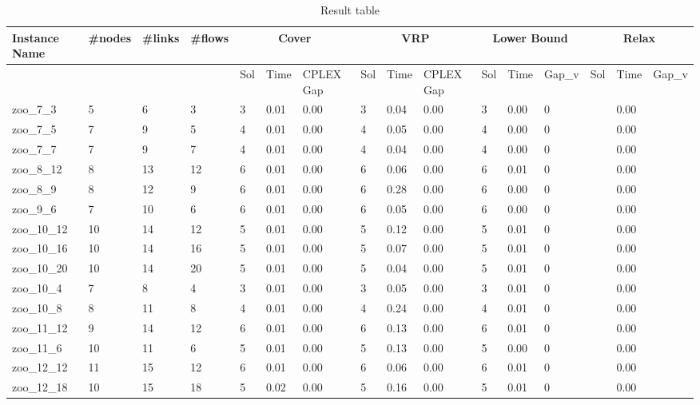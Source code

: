 \begin{landscape}
\begin{longtable}{llllllllllllllll}
\caption{Result table}
\hline
Instance Name & \#nodes & \#links & \#flows & \multicolumn{3}{c|}{Cover} & \multicolumn{3}{c|}{VRP} & \multicolumn{3}{c|}{Lower Bound} & \multicolumn{3}{c|}{Relax} \\ \hline
& & & & Sol & Time & CPLEX Gap & Sol & Time & CPLEX Gap & Sol & Time & Gap_v & Sol & Time & Gap_v \\ \hline
zoo\_7\_3 & 5 & 6 & 3 & 3 & 0.01 & 0.00 & 3 & 0.04 & 0.00 & 3 & 0.00 & 0 &  & 0.00 &  \\ \hline 
zoo\_7\_5 & 7 & 9 & 5 & 4 & 0.01 & 0.00 & 4 & 0.05 & 0.00 & 4 & 0.00 & 0 &  & 0.00 &  \\ \hline 
zoo\_7\_7 & 7 & 9 & 7 & 4 & 0.01 & 0.00 & 4 & 0.04 & 0.00 & 4 & 0.00 & 0 &  & 0.00 &  \\ \hline 
zoo\_8\_12 & 8 & 13 & 12 & 6 & 0.01 & 0.00 & 6 & 0.06 & 0.00 & 6 & 0.01 & 0 &  & 0.00 &  \\ \hline 
zoo\_8\_9 & 8 & 12 & 9 & 6 & 0.01 & 0.00 & 6 & 0.28 & 0.00 & 6 & 0.00 & 0 &  & 0.00 &  \\ \hline 
zoo\_9\_6 & 7 & 10 & 6 & 6 & 0.01 & 0.00 & 6 & 0.05 & 0.00 & 6 & 0.00 & 0 &  & 0.00 &  \\ \hline 
zoo\_10\_12 & 10 & 14 & 12 & 5 & 0.01 & 0.00 & 5 & 0.12 & 0.00 & 5 & 0.01 & 0 &  & 0.00 &  \\ \hline 
zoo\_10\_16 & 10 & 14 & 16 & 5 & 0.01 & 0.00 & 5 & 0.07 & 0.00 & 5 & 0.01 & 0 &  & 0.00 &  \\ \hline 
zoo\_10\_20 & 10 & 14 & 20 & 5 & 0.01 & 0.00 & 5 & 0.04 & 0.00 & 5 & 0.01 & 0 &  & 0.00 &  \\ \hline 
zoo\_10\_4 & 7 & 8 & 4 & 3 & 0.01 & 0.00 & 3 & 0.05 & 0.00 & 3 & 0.01 & 0 &  & 0.00 &  \\ \hline 
zoo\_10\_8 & 8 & 11 & 8 & 4 & 0.01 & 0.00 & 4 & 0.24 & 0.00 & 4 & 0.01 & 0 &  & 0.00 &  \\ \hline 
zoo\_11\_12 & 9 & 14 & 12 & 6 & 0.01 & 0.00 & 6 & 0.13 & 0.00 & 6 & 0.01 & 0 &  & 0.00 &  \\ \hline 
zoo\_11\_6 & 10 & 11 & 6 & 5 & 0.01 & 0.00 & 5 & 0.13 & 0.00 & 5 & 0.00 & 0 &  & 0.00 &  \\ \hline 
zoo\_12\_12 & 11 & 15 & 12 & 6 & 0.01 & 0.00 & 6 & 0.06 & 0.00 & 6 & 0.01 & 0 &  & 0.00 &  \\ \hline 
zoo\_12\_18 & 10 & 15 & 18 & 5 & 0.02 & 0.00 & 5 & 0.16 & 0.00 & 5 & 0.01 & 0 &  & 0.00 &  \\ \hline 

\end{longtable}
\end{landscape}
